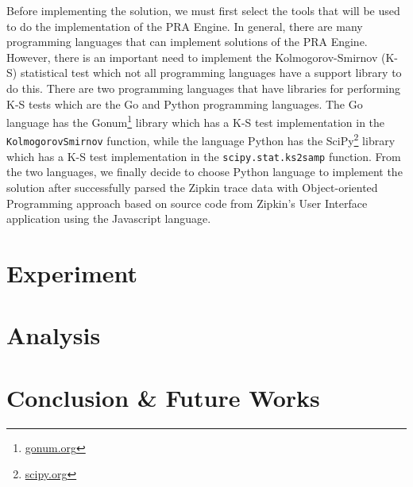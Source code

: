 \documentclass[conference]{configs/IEEEtran}
\begin{document}
Before implementing the solution, we  must first
select the tools that will be used to do the implementation of the PRA Engine. In general, there are many programming languages that can implement solutions of the PRA Engine. However, there is an important need to implement the Kolmogorov-Smirnov (K-S) statistical test which not all programming languages have a support library to do this. There are two programming languages that have libraries for performing K-S tests
which are the Go and Python programming languages. The Go language has the Gonum\footnote{\url{gonum.org}} library which
has a K-S test implementation in the \texttt{KolmogorovSmirnov} function, while the language
Python has the SciPy\footnote{\url{scipy.org}} library which has a K-S test implementation in the \texttt{scipy.stat.ks\textunderscore 2samp} function. From the two languages, we finally decide to choose Python language to implement the solution after successfully parsed the Zipkin trace data with Object-oriented Programming approach based on source code from Zipkin's User Interface application using the Javascript language.

\section{Experiment}

\section{Analysis}

\section{Conclusion \& Future Works}

%




\vspace{12pt}
\end{document}
